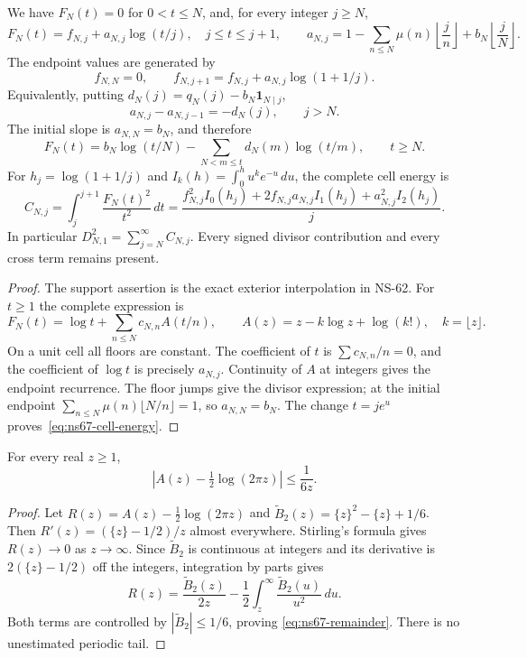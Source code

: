 \begin{proposition}
\label{prop:ns67-cells}
We have $F_N(t)=0$ for $0<t\leq N$, and, for every integer $j\geq N$,
\begin{equation}
 F_N(t)=f_{N,j}+a_{N,j}\log(t/j),\quad j\leq t\leq j+1,
 \qquad
 a_{N,j}=1-\sum_{n\leq N}\mu(n)\left\lfloor\frac jn\right\rfloor
                   +b_N\left\lfloor\frac jN\right\rfloor.
 \label{eq:ns67-cell}
\end{equation}
The endpoint values are generated by
\[
 f_{N,N}=0,\qquad
 f_{N,j+1}=f_{N,j}+a_{N,j}\log(1+1/j).
\]
Equivalently, putting $d_N(j)=q_N(j)-b_N\mathbf1_{N\mid j}$,
\[
 a_{N,j}-a_{N,j-1}=-d_N(j),\qquad j>N.
\]
The initial slope is $a_{N,N}=b_N$, and therefore
\begin{equation}
 F_N(t)=b_N\log(t/N)
          -\sum_{N<m\leq t}d_N(m)\log(t/m),\qquad t\geq N.
 \label{eq:ns67-divisor-response}
\end{equation}
For $h_j=\log(1+1/j)$ and
$I_k(h)=\int_0^h u^ke^{-u}\,du$, the complete cell energy is
\begin{equation}
 C_{N,j}=\int_j^{j+1}\frac{F_N(t)^2}{t^2}\,dt
 =\frac{f_{N,j}^2 I_0(h_j)+2f_{N,j}a_{N,j}I_1(h_j)
                       +a_{N,j}^2 I_2(h_j)}j.
 \label{eq:ns67-cell-energy}
\end{equation}
In particular $D_{N,1}^2=\sum_{j=N}^\infty C_{N,j}$.
Every signed divisor contribution and every cross term remains present.
\end{proposition}
\begin{proof}
The support assertion is the exact exterior interpolation in NS-62.
For $t\geq1$ the complete expression is
\[
 F_N(t)=\log t+\sum_{n\leq N}c_{N,n}A(t/n),
 \qquad A(z)=z-k\log z+\log(k!),\quad k=\lfloor z\rfloor.
\]
On a unit cell all floors are constant. The coefficient of $t$ is
$\sum c_{N,n}/n=0$, and the coefficient of $\log t$ is precisely
$a_{N,j}$. Continuity of $A$ at integers gives the endpoint recurrence.
The floor jumps give the divisor expression; at the initial endpoint
$\sum_{n\leq N}\mu(n)\lfloor N/n\rfloor=1$, so $a_{N,N}=b_N$.
The change $t=je^u$ proves~\eqref{eq:ns67-cell-energy}.
\end{proof}

\begin{lemma}
\label{lem:ns67-remainder}
For every real $z\geq1$,
\begin{equation}
 \left|A(z)-\tfrac12\log(2\pi z)\right|\leq\frac1{6z}.
 \label{eq:ns67-remainder}
\end{equation}
\end{lemma}
\begin{proof}
Let $R(z)=A(z)-\tfrac12\log(2\pi z)$ and
$\widetilde B_2(z)=\{z\}^2-\{z\}+1/6$.
Then $R'(z)=(\{z\}-1/2)/z$ almost everywhere.
Stirling's formula gives $R(z)\to0$ as $z\to\infty$.
Since $\widetilde B_2$ is continuous at integers and its derivative
is $2(\{z\}-1/2)$ off the integers, integration by parts gives
\[
 R(z)=\frac{\widetilde B_2(z)}{2z}
             -\frac12\int_z^\infty\frac{\widetilde B_2(u)}{u^2}\,du.
\]
Both terms are controlled by $|\widetilde B_2|\leq1/6$, proving
\eqref{eq:ns67-remainder}. There is no unestimated periodic tail.
\end{proof}

